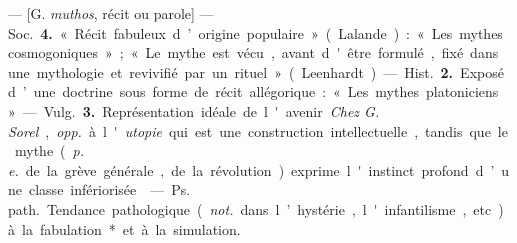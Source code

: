 \begin{itemize}[leftmargin=1cm, label=, itemsep=1pt]
 — [G. {\it muthos}, récit ou parole] — \si{Soc.} {\bf 4.} « Récit
fabuleux d’origine populaire » (Lalande) : « Les mythes cosmogoniques » ;
« Le mythe est vécu, avant d'être formulé, fixé dans une mythologie et
revivifié par un rituel » (Leenhardt).

— \si{Hist.} {\bf 2.} Exposé d’une doctrine sous forme de récit allégorique :
« Les mythes platoniciens ».

— \si{Vulg.} {\bf 3.} Représentation idéale de l'avenir. {\it Chez G. Sorel},
{\it opp.} à l'{\it utopie} qui est une construction intellectuelle, tandis
que le mythe ({\it p. e.} de la grève générale, de la révolution) exprime
l'instinct profond d’une classe infériorisée.

 — \si{Ps. path.} Tendance pathologique ({\it not.} dans
l’hystérie, l'infantilisme, etc.) à la fabulation* et à la simulation.

	\end{itemize}
